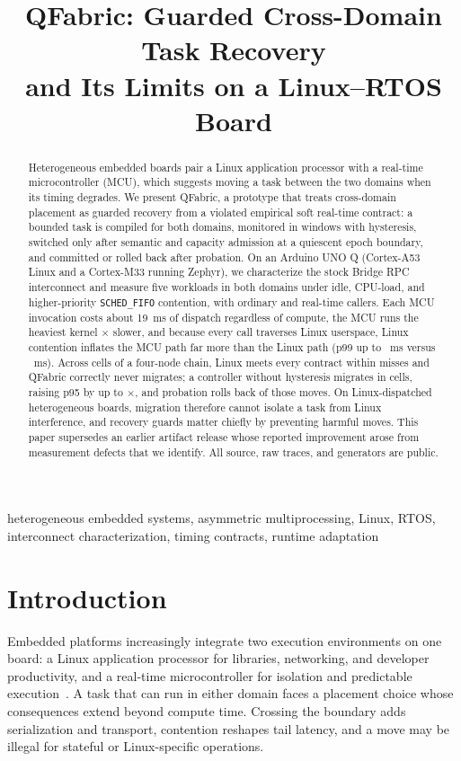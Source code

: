 \documentclass[conference]{IEEEtran}
\title{QFabric: Guarded Cross-Domain Task Recovery\\and Its Limits on a Linux--RTOS Board}
\author{\IEEEauthorblockN{Ayushman Bhattacharya}
\IEEEauthorblockA{\textit{Pollinations AI}\\
\href{mailto:ayushman.elixpo@gmail.com}{ayushman.elixpo@gmail.com}}
\and
\IEEEauthorblockN{Anwesha Chakraborty}
\IEEEauthorblockA{\textit{Dept. CSE, JIS University}\\
\href{mailto:anwesha.elixpo@gmail.com}{anwesha.elixpo@gmail.com}}}
\newcommand{\system}{QFabric\xspace}
\begin{document}
\maketitle

\begin{abstract}
Heterogeneous embedded boards pair a Linux application processor with a
real-time microcontroller (MCU), which suggests moving a task between the two
domains when its timing degrades. We present \system, a prototype that treats
cross-domain placement as guarded recovery from a violated empirical soft
real-time contract: a bounded task is compiled for both domains, monitored in
windows with hysteresis, switched only after semantic and capacity admission
at a quiescent epoch boundary, and committed or rolled back after probation.
On an Arduino UNO Q (Cortex-A53 Linux and a Cortex-M33 running Zephyr), we
characterize the stock Bridge RPC interconnect and measure five workloads in
both domains under idle, CPU-load, and higher-priority \texttt{SCHED\_FIFO}
contention, with ordinary and real-time callers. Each MCU invocation costs
about 19~ms of dispatch regardless of compute, the MCU runs the heaviest
kernel \StageTwelveFirComputeRatio$\times$ slower, and because every call
traverses Linux userspace, Linux contention inflates the MCU path far more
than the Linux path (p99 up to \StageTwelveContentionRtPNinetyNine~ms versus
\StageTwelveContentionLinuxPNinetyNine~ms). Across \StageTwelveCells{} cells
of a four-node chain, Linux meets every contract within
\StageTwelveWorstLinuxMiss{} misses and \system correctly never migrates; a
controller without hysteresis migrates in \StageTwelveAblatedSwitches{} cells,
raising p95 by up to \StageTwelveAblationWorstRatio$\times$, and probation
rolls back \StageTwelveAblatedRollbacks{} of those moves. On Linux-dispatched
heterogeneous boards, migration therefore cannot isolate a task from Linux
interference, and recovery guards matter chiefly by preventing harmful moves.
This paper supersedes an earlier artifact release whose reported improvement
arose from measurement defects that we identify. All source, raw traces, and
generators are public.
\end{abstract}

\begin{IEEEkeywords}
heterogeneous embedded systems, asymmetric multiprocessing, Linux, RTOS,
interconnect characterization, timing contracts, runtime adaptation
\end{IEEEkeywords}

\section{Introduction}
\label{sec:intro}
Embedded platforms increasingly integrate two execution environments on one
board: a Linux application processor for libraries, networking, and developer
productivity, and a real-time microcontroller for isolation and predictable
execution~\cite{arduinoUnoQ,openampProject}. A task that can run in either
domain faces a placement choice whose consequences extend beyond compute
time. Crossing the boundary adds serialization and transport, contention
reshapes tail latency, and a move may be illegal for stateful or
Linux-specific operations.
\end{document}
